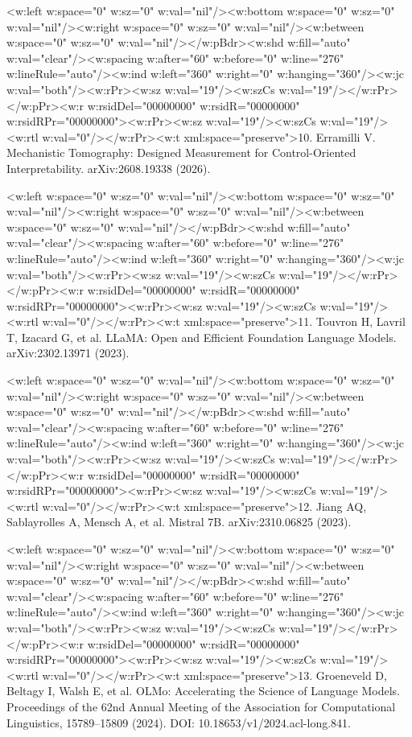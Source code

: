 \documentclass[11pt]{article}
\begin{document}
<w:left w:space="0" w:sz="0" w:val="nil"/><w:bottom w:space="0" w:sz="0" w:val="nil"/><w:right w:space="0" w:sz="0" w:val="nil"/><w:between w:space="0" w:sz="0" w:val="nil"/></w:pBdr><w:shd w:fill="auto" w:val="clear"/><w:spacing w:after="60" w:before="0" w:line="276" w:lineRule="auto"/><w:ind w:left="360" w:right="0" w:hanging="360"/><w:jc w:val="both"/><w:rPr><w:sz w:val="19"/><w:szCs w:val="19"/></w:rPr></w:pPr><w:r w:rsidDel="00000000" w:rsidR="00000000" w:rsidRPr="00000000"><w:rPr><w:sz w:val="19"/><w:szCs w:val="19"/><w:rtl w:val="0"/></w:rPr><w:t xml:space="preserve">10. Erramilli V. Mechanistic Tomography: Designed Measurement for Control-Oriented Interpretability. arXiv:2608.19338 (2026).

<w:left w:space="0" w:sz="0" w:val="nil"/><w:bottom w:space="0" w:sz="0" w:val="nil"/><w:right w:space="0" w:sz="0" w:val="nil"/><w:between w:space="0" w:sz="0" w:val="nil"/></w:pBdr><w:shd w:fill="auto" w:val="clear"/><w:spacing w:after="60" w:before="0" w:line="276" w:lineRule="auto"/><w:ind w:left="360" w:right="0" w:hanging="360"/><w:jc w:val="both"/><w:rPr><w:sz w:val="19"/><w:szCs w:val="19"/></w:rPr></w:pPr><w:r w:rsidDel="00000000" w:rsidR="00000000" w:rsidRPr="00000000"><w:rPr><w:sz w:val="19"/><w:szCs w:val="19"/><w:rtl w:val="0"/></w:rPr><w:t xml:space="preserve">11. Touvron H, Lavril T, Izacard G, et al. LLaMA: Open and Efficient Foundation Language Models. arXiv:2302.13971 (2023).

<w:left w:space="0" w:sz="0" w:val="nil"/><w:bottom w:space="0" w:sz="0" w:val="nil"/><w:right w:space="0" w:sz="0" w:val="nil"/><w:between w:space="0" w:sz="0" w:val="nil"/></w:pBdr><w:shd w:fill="auto" w:val="clear"/><w:spacing w:after="60" w:before="0" w:line="276" w:lineRule="auto"/><w:ind w:left="360" w:right="0" w:hanging="360"/><w:jc w:val="both"/><w:rPr><w:sz w:val="19"/><w:szCs w:val="19"/></w:rPr></w:pPr><w:r w:rsidDel="00000000" w:rsidR="00000000" w:rsidRPr="00000000"><w:rPr><w:sz w:val="19"/><w:szCs w:val="19"/><w:rtl w:val="0"/></w:rPr><w:t xml:space="preserve">12. Jiang AQ, Sablayrolles A, Mensch A, et al. Mistral 7B. arXiv:2310.06825 (2023).

<w:left w:space="0" w:sz="0" w:val="nil"/><w:bottom w:space="0" w:sz="0" w:val="nil"/><w:right w:space="0" w:sz="0" w:val="nil"/><w:between w:space="0" w:sz="0" w:val="nil"/></w:pBdr><w:shd w:fill="auto" w:val="clear"/><w:spacing w:after="60" w:before="0" w:line="276" w:lineRule="auto"/><w:ind w:left="360" w:right="0" w:hanging="360"/><w:jc w:val="both"/><w:rPr><w:sz w:val="19"/><w:szCs w:val="19"/></w:rPr></w:pPr><w:r w:rsidDel="00000000" w:rsidR="00000000" w:rsidRPr="00000000"><w:rPr><w:sz w:val="19"/><w:szCs w:val="19"/><w:rtl w:val="0"/></w:rPr><w:t xml:space="preserve">13. Groeneveld D, Beltagy I, Walsh E, et al. OLMo: Accelerating the Science of Language Models. Proceedings of the 62nd Annual Meeting of the Association for Computational Linguistics, 15789–15809 (2024). DOI: 10.18653/v1/2024.acl-long.841.
\end{document}
